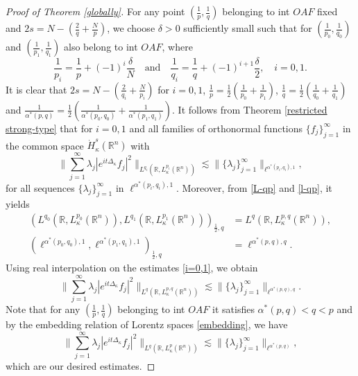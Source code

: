 \documentclass[a4paper,11pt, reqno]{amsart}
\numberwithin{equation}{section}
\theoremstyle{plain}
\theoremstyle{definition}
\theoremstyle{remark}
\begin{document}
\begin{proof}[Proof of Theorem \ref{globally}]
For any point $(\frac{1}{p},\frac{1}{q})$ belonging to int $OAF$ fixed and $2s=N-\left(\frac{2}{q}+\frac{N}{p}\right)$, we choose $\delta>0$ sufficiently small such that for $(\frac{1}{p_0},\frac{1}{q_0})$ and $(\frac{1}{p_1},\frac{1}{q_1})$ also belong to int $OAF$, where 
\begin{equation*}
    \frac{1}{p_i}=\frac{1}{p}+(-1)^i\frac{\delta}{N} \quad\text{and}\quad \frac{1}{q_i}=\frac{1}{q}+(-1)^{i+1}\frac{\delta}{2},\quad i=0,1.
\end{equation*}
It is clear that $2s=N-\left(\frac{2}{q_i}+\frac{N}{p_i}\right)$ for $i=0,1$, $\frac{1}{p}=\frac{1}{2}\left(\frac{1}{p_0}+\frac{1}{p_1}\right)$, $\frac{1}{q}=\frac{1}{2}\left(\frac{1}{q_0}+\frac{1}{q_1}\right)$ and $\frac{1}{\alpha^*(p,q)}=\frac{1}{2}\left(\frac{1}{\alpha^*(p_0,q_0)}+\frac{1}{\alpha^*(p_1,q_1)}\right)$. It follows from Theorem \ref{restricted strong-type} that for $i=0,1$ and all families of orthonormal functions $\{f_j\}_{j=1}^\infty$ in the common space $\dot{H}_\kappa^{s}(\mathbb{R}^n)$ with
\begin{equation}\label{i=0,1}
			\bigg\|\sum_{j=1}^\infty \lambda_j|e^{it\Delta_\kappa}f_j|^2\bigg\|_{L^{q_i}(\mathbb{R}, L_\kappa^{p_i}(\mathbb{R}^n))}\lesssim \|\{\lambda_j\}^\infty_{j=1}\|_{\ell^{\alpha^*(p_i,q_i),1}}, 
\end{equation}	
    for all sequences $\{\lambda_j\}^\infty_{j=1}$ in $\ell^{\alpha^*(p_i,q_i),1}$.  Moreover, from   \eqref{L-qp} and \eqref{l-qp}, it yields 
  \begin{align*}
       \left(L^{q_0}(\mathbb{R},L_\kappa^{p_0}(\mathbb{R}^n)),L^{q_1}(\mathbb{R},L_\kappa^{p_1}(\mathbb{R}^n))\right)_{\frac{1}{2},q}&=L^{q}(\mathbb{R},L_\kappa^{p,q}(\mathbb{R}^n)),\\
        \left(\ell^{\alpha^*(p_0,q_0),1},\ell^{\alpha^*(p_1,q_1),1}\right)_{\frac{1}{2},q}&=\ell^{\alpha^*(p,q),q}.
  \end{align*}
Using real interpolation on the estimates \eqref{i=0,1}, we obtain
\begin{equation*}
			\bigg\|\sum_{j=1}^\infty \lambda_j|e^{it\Delta_\kappa}f_j|^2\bigg\|_{L^{q}(\mathbb{R}, L_\kappa^{p,q}(\mathbb{R}^n))}\lesssim \|\{\lambda_j\}^\infty_{j=1}\|_{\ell^{\alpha^*(p,q),q}}.
\end{equation*}	
Note that for any $(\frac{1}{p},\frac{1}{q})$ belonging to int $OAF$ it satisfies $\alpha^*(p,q)<q<p$ and by the embedding relation of Lorentz spaces \eqref{embedding}, we have
\begin{equation*}
			\bigg\|\sum_{j=1}^\infty \lambda_j|e^{it\Delta_\kappa}f_j|^2\bigg\|_{L^{q}(\mathbb{R}, L_\kappa^{p}(\mathbb{R}^n))}\lesssim \|\{\lambda_j\}^\infty_{j=1}\|_{\ell^{\alpha^*(p,q)}},
\end{equation*}	
which are our desired estimates.
\end{proof}
\end{document}
